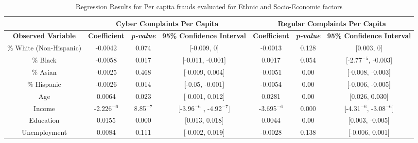 \documentclass[conference]{IEEEtran}
\begin{document}
\begin{table}[h]
\noindent
\centering
\begin{tabular}{c||c|c|c||c|c|c}
\hline
\multicolumn{1}{c||}{\bfseries } & \multicolumn{3}{c||}{\bfseries Cyber Complaints Per Capita} & \multicolumn{3}{c}{\bfseries Regular Complaints Per Capita}\\
\hline
\bfseries Observed Variable & \bfseries Coefficient & \bfseries \emph{p-value} & \bfseries 95\% Confidence Interval & \bfseries Coefficient & \bfseries \emph{p-value} & \bfseries 95\% Confidence Interval \\
\hline
\% White (Non-Hispanic) & -0.0042 & 0.074 & [-0.009, 0] & -0.0013 &  0.128 & [0.003,  0]\\
\hline
\% Black & -0.0058 & 0.017 & [-0.011, -0.001] & 0.0017 & 0.054 & [-2.77$^{-5}$, -0.003]\\
\hline
\% Asian & -0.0025 & 0.468 & [-0.009, 0.004] & -0.0051 & 0.00 & [-0.008, -0.003]\\
\hline
\% Hispanic & -0.0026 & 0.014 & [-0.05, -0.001] & -0.0054 & 0.00 & [-0.006, -0.005]\\
\hline
Age & 0.0064 & 0.023 & [ 0.001, 0.012] & 0.0281 & 0.00 & [0.026, 0.030]\\
\hline
Income & -2.226$^{-6}$ & 8.85$^{-7}$ & [-3.96$^{-6}$ , -4.92$^{-7}$] & -3.695$^{-6}$ & 0.000  & [-4.31$^{-6}$, -3.08$^{-6}$]\\
\hline
Education & 0.0155 & 0.000 & [0.013, 0.018] & 0.0044 & 0.00 & [0.003, -0.005]\\
\hline
Unemployment & 0.0084 & 0.111 & [-0.002, 0.019] & -0.0028 & 0.138 & [-0.006, 0.001]\\
\hline
\end{tabular}

\vspace{8pt}
\caption{Regression Results for Per capita frauds evaluated for Ethnic and Socio-Economic factors}\label{regressions}
\vspace{-20pt}
\end{table}
\end{document}
